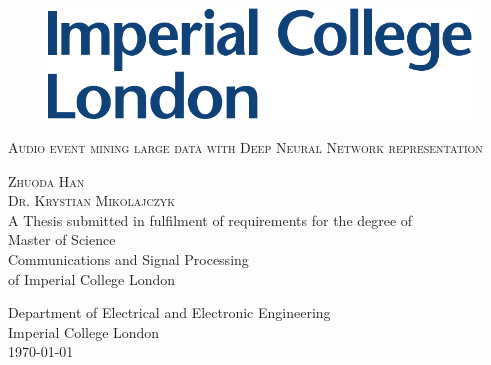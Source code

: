 
\thispagestyle{empty}
\begin{figure}
\includegraphics[scale=0.4]{logo.pdf}
\end{figure}

\begin{center}
\null {}
\renewcommand{\baselinestretch}{2}
\textsc{\huge{Audio event mining large data with Deep Neural Network representation}}



\textsc{\large{Zhuoda Han}} \\
\textsc{\large{Dr. Krystian Mikolajczyk}} \\

A Thesis submitted in fulfilment of requirements for the degree of \\
Master of Science\\
Communications and Signal Processing \\
of Imperial College London




Department of Electrical and Electronic Engineering\\
Imperial College London\\
\today

\end{center}


